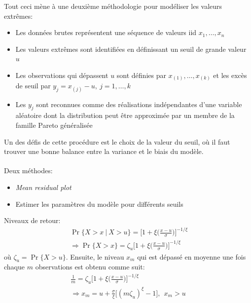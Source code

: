 \documentclass[aspectratio=169, 12pt, french]{beamer}
\begin{document}
\begin{frame}
Tout ceci mène à une deuxième méthodologie pour modéliser les valeurs extrêmes:
\begin{itemize}
\item Les données brutes représentent une séquence de valeurs iid  $x_1,\dots,x_n$
\item Les valeurs extrêmes sont identifiées en définissant un seuil de grande valeur $u$
\item Les observations qui dépassent $u$ sont définies par $x_{(1)},\dots,x_{(k)}$ et les excès de seuil par $y_j = x_{(j)} - u,\ j=1,\dots,k$
\item Les $y_j$ sont reconnues comme des réalisations indépendantes d'une variable aléatoire dont la distribution peut être approximée par un membre de la famille Pareto généralisée
\end{itemize}
\end{frame}

\begin{frame}
Un des défis de cette procédure est le choix de la valeur du seuil, où il faut trouver une bonne balance entre la variance et le biais du modèle. \\~\\
Deux méthodes:
\begin{itemize}
\item \textit{Mean residual plot}
\item Estimer les paramètres du modèle pour différents seuils
\end{itemize}
\end{frame}


\begin{frame}
Niveaux de retour:
\begin{equation}\
\begin{split}
{\Pr\{ X>x\ |\ X>u\} = \Big[ 1 + \xi \Big( \frac{x-u}{\sigma}\Big)\Big]^{-1/\xi}}\\
{\Rightarrow \Pr\{X>x\} = \zeta_u \Big[1 + \xi \Big( \frac{x-u}{\sigma}\Big)\Big]^{-1/\xi}}
\end{split}
\end{equation}
où $\zeta_u = \Pr\{X>u\}$. Ensuite, le niveau $x_m$ qui est dépassé en moyenne une fois chaque $m$ observations est obtenu comme suit:
\begin{equation}
\begin{split}
{\frac{1}{m} = \zeta_u \Big[1 + \xi \Big( \frac{x-u}{\sigma}\Big)\Big]^{-1/\xi}}\\
{\Rightarrow x_m = u + \frac{\sigma}{\xi} \Big[(m\zeta_u)^\xi -1\Big],\ \ x_m>u}
\end{split}
\end{equation}
\end{frame}
\end{document}
